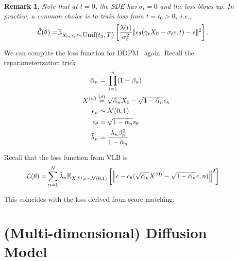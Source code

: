 \documentclass[11pt, a4paper]{article}
\newtheorem{remark}{Remark}
\begin{document}
\begin{remark}
    Note that at $t=0$, the SDE has $\sigma_t=0$ and the loss blows up.
    In practice, a common choice is to train loss from $t=t_0>0$, i.e.,
    \begin{align}
        \tilde{{\cal L}}(\theta) 
        =& \mathbb{E}_{X_0, \,\epsilon,\, t\sim\mbox{Unif$(t_0,T)$}}\left[\frac{\lambda(t)}{\sigma_t^2} \| \epsilon_\theta(\gamma_tX_0 - \sigma_t\epsilon, t) - \epsilon\|^2 \right].
    \end{align}
\end{remark}


We can compute the loss function for DDPM~\cite{ho2020denoising} again.
Recall the reparameterization trick
\begin{align}
\bar{\alpha}_n =&\; \prod_{i=1}^n (1-\beta_n)\\
X^{(n)} \stackrel{(d)}{=} &\; \sqrt{\bar{\alpha}_n} X_0 - \sqrt{1-\bar{\alpha}_n} \epsilon_n\\
\epsilon_n \sim&\; {\cal N}(0, 1)\\
\epsilon_\theta =&\; \sqrt{1-\bar{\alpha}_n} s_{\theta}\\
\tilde{\lambda}_n =&\; \frac{\lambda_n \beta_n^2}{1-\bar{\alpha}_n}
\end{align}

Recall that the loss function from VLB is
\begin{align}
    {\cal L}(\theta)
    =&\sum_{n=1}^N \tilde{\lambda}_n \mathbb{E}_{X^{(0)}, \epsilon\sim{\cal N}(0, 1)}\left[\left\| \epsilon - \epsilon_{\theta}(\sqrt{\bar{\alpha}_n}X^{(0)} - \sqrt{1-\bar{\alpha}_n}\epsilon, n)\right\|^2\right]
\end{align}

This coincides with the loss derived from score matching.


\section{(Multi-dimensional) Diffusion Model}
\end{document}
